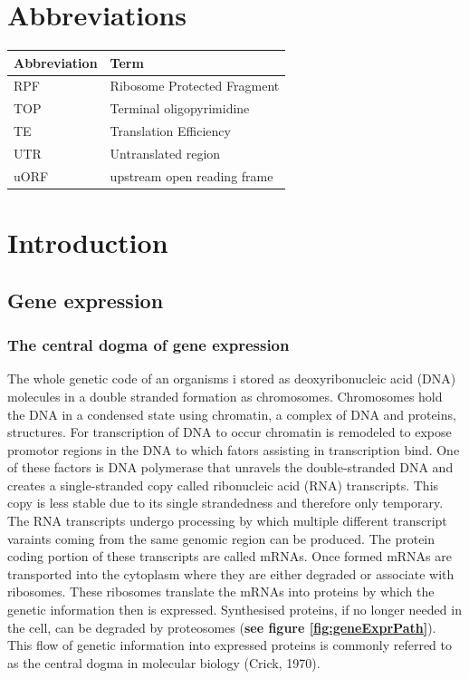 \documentclass[12pt,openany]{book}
\author{}
\date{\vspace{-2.5em}}
\begin{document}
{
\setcounter{tocdepth}{4}
\tableofcontents
}
\cleardoublepage
\pagestyle{fancy} \fancyhf{} \renewcommand{\headrulewidth}{0pt}
\fancyfoot[LE,RO]{\thepage} \renewcommand{\floatpagefraction}{.9}
\setcounter{page}{9}

\chapter*{Abbreviations}\label{abbreviations}

\begin{tabular}{ll}
\toprule
Abbreviation & Term\\
\midrule
RPF & Ribosome Protected Fragment\\
TOP & Terminal oligopyrimidine\\
TE & Translation Efficiency\\
UTR & Untranslated region\\
uORF & upstream open reading frame\\
\bottomrule
\end{tabular}

\chapter{Introduction}

\section{Gene expression}\subsection{The central dogma of gene expression}

The whole genetic code of an organisms i stored as deoxyribonucleic acid
(DNA) molecules in a double stranded formation as chromosomes.
Chromosomes hold the DNA in a condensed state using chromatin, a complex
of DNA and proteins, structures. For transcription of DNA to occur
chromatin is remodeled to expose promotor regions in the DNA to which
fators assisting in transcription bind. One of these factors is DNA
polymerase that unravels the double-stranded DNA and creates a
single-stranded copy called ribonucleic acid (RNA) transcripts. This
copy is less stable due to its single strandedness and therefore only
temporary. The RNA transcripts undergo processing by which multiple
different transcript varaints coming from the same genomic region can be
produced. The protein coding portion of these transcripts are called
mRNAs. Once formed mRNAs are transported into the cytoplasm where they
are either degraded or associate with ribosomes. These ribosomes
translate the mRNAs into proteins by which the genetic information then
is expressed. Synthesised proteins, if no longer needed in the cell, can
be degraded by proteosomes (\textbf{see figure \ref{fig:geneExprPath}}).
This flow of genetic information into expressed proteins is commonly
referred to as the central dogma in molecular biology (Crick, 1970).
\clearpage
\end{document}

